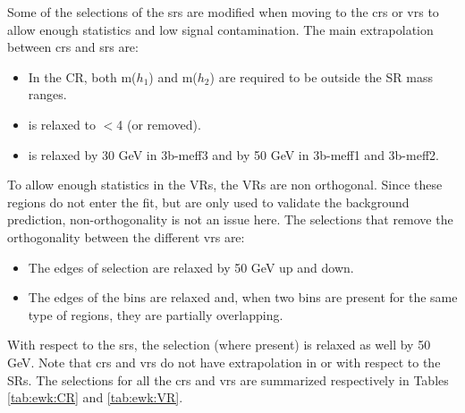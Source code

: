 Some of the selections of the \glspl{sr} are modified when moving to the \glspl{cr} or \glspl{vr}
 to allow enough statistics and low signal contamination.
The main extrapolation between \glspl{cr} and \glspl{sr} are:

\begin{itemize}
\item In the CR, both m($h_1$) and m($h_2$) are required to be outside the SR mass ranges.
\item \dRmax is relaxed to $<$4 (or removed).
\item \mtb is relaxed by 30 GeV in 3b-meff3 and by 50 GeV in 3b-meff1 and 3b-meff2.
\end{itemize}

To allow enough statistics in the VRs, the VRs are non orthogonal. Since these regions do not enter the fit, but are only used to validate the background prediction, non-orthogonality is not an issue here. 
The selections that remove the orthogonality between the different \glspl{vr} are:
\begin{itemize}
\item The edges of \meffb selection are relaxed by 50 GeV up and down.
\item The edges of the \dRmax bins are relaxed and, when two \dRmax bins are present for the same type of regions, they are partially overlapping.
\end{itemize}

With respect to the \glspl{sr}, the \mtb selection (where present) is relaxed as well by 50 GeV. 
Note that \glspl{cr} and \glspl{vr} do not have extrapolation in \nbjet or \njet with respect to the SRs.
The selections for all the \glspl{cr} and \glspl{vr} are summarized respectively in Tables \ref{tab:ewk:CR} and \ref{tab:ewk:VR}.


